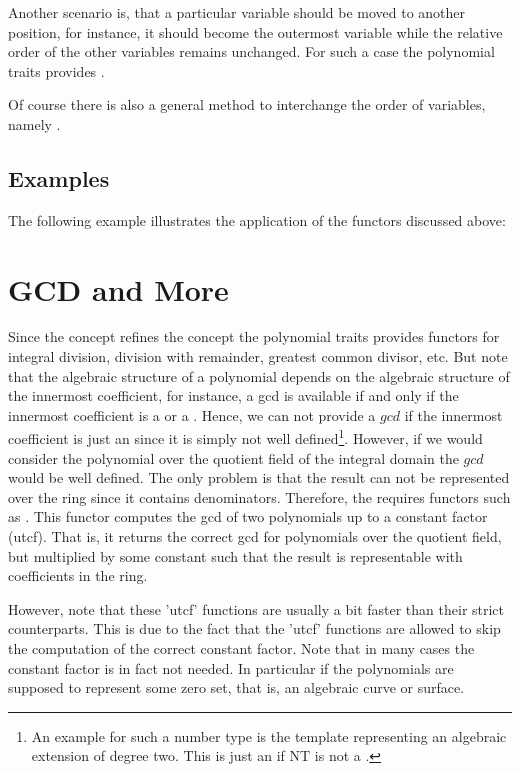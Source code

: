 Another scenario is, that a particular variable should be moved to another 
position, for instance, it should become the outermost variable while the 
relative order of the other variables remains unchanged. 
For such a case the polynomial traits provides .

Of course there is also a general method to interchange the order of 
variables, namely .

\subsection{Examples}
The following example illustrates the application of the functors discussed 
above:


\section{GCD and More}

Since the concept  refines the concept 
 the polynomial traits provides functors for 
integral division, division with remainder, greatest common divisor, etc.
But note that the algebraic structure of a polynomial depends on the algebraic 
structure of the innermost coefficient, for instance, a gcd is available 
if and only if the innermost coefficient is a  or a 
. Hence, we can not provide a $gcd$ if the 
innermost coefficient is just an  since it is simply 
not well defined\footnote{%
An example for such a number type is the template 
 representing an algebraic extension of 
degree two. This is just an  if NT is not a . }.
% 
However, if we would consider the polynomial over the quotient field of the 
integral domain the $gcd$ would be well defined. The only problem is
that the result can not be represented over the ring since it contains 
denominators.   
Therefore, the  requires functors such as 
. 
This functor computes the gcd of two polynomials up to a constant factor (utcf).
That is, it returns the correct gcd for polynomials over the quotient field, 
but multiplied by some constant such that the result is representable with 
coefficients in the ring. 

However, note that these 'utcf' functions are usually a bit faster than their 
strict counterparts. This is due to the fact that the 'utcf' functions are allowed 
to skip the computation of the correct constant factor.
Note that in many cases the constant factor is in fact not needed.
In particular if the polynomials are supposed to represent some zero set, 
that is, an algebraic curve or surface.  

